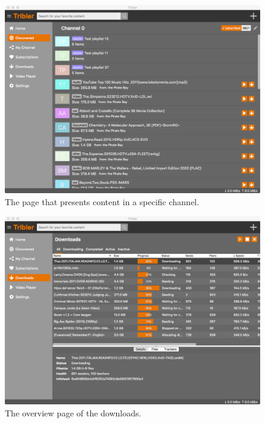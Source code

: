 \begin{figure}[h!]
	\centering
	\includegraphics[width=0.95\columnwidth]{images/qt_gui/screenshot_channel}
	\caption{The page that presents content in a specific channel.}
	\label{fig:gui-screenshot-channel}
\end{figure}

\begin{figure}[h!]
	\centering
	\includegraphics[width=0.95\columnwidth]{images/qt_gui/screenshot_downloads}
	\caption{The overview page of the downloads.}
	\label{fig:gui-screenshot-downloads}
\end{figure}

